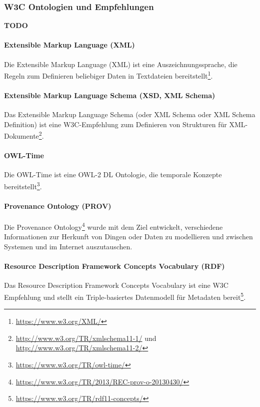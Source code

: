 \documentclass{article}
\begin{document}
\subsubsection{W3C Ontologien und Empfehlungen}

\textbf{TODO}

\paragraph{Extensible Markup Language (XML)}

Die Extensible Markup Language (XML) ist eine Auszeichnungssprache, die Regeln zum Definieren beliebiger Daten in Textdateien bereitstellt\footnote{\url{https://www.w3.org/XML/}}.

\paragraph{Extensible Markup Language Schema (XSD, XML Schema)}

Das Extensible Markup Language Schema (oder XML Schema oder XML Schema Definition) ist eine W3C-Empfehlung zum Definieren von Strukturen für XML-Dokumente\footnote{\url{http://www.w3.org/TR/xmlschema11-1/} und \url{http://www.w3.org/TR/xmlschema11-2/}}.

\paragraph{OWL-Time} Die OWL-Time ist eine OWL-2 DL Ontologie, die temporale Konzepte bereitstellt\footnote{\url{https://www.w3.org/TR/owl-time/}}.

\paragraph{Provenance Ontology (PROV)}

Die Provenance Ontology\footnote{\url{https://www.w3.org/TR/2013/REC-prov-o-20130430/}} wurde mit dem Ziel entwickelt, verschiedene Informationen zur Herkunft von Dingen oder Daten zu modellieren und zwischen Systemen und im Internet auszutauschen.

\paragraph{Resource Description Framework Concepts Vocabulary (RDF)}

Das Resource Description Framework Concepts Vocabulary ist eine W3C Empfehlung und stellt ein Triple-basiertes Datenmodell für Metadaten bereit\footnote{\url{https://www.w3.org/TR/rdf11-concepts/}}.
\end{document}
